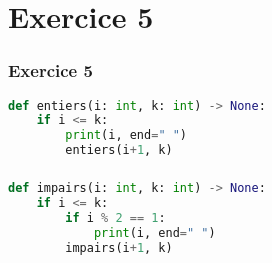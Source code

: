 \documentclass[svgnames,11pt]{beamer}
\begin{document}
\section{Exercice 5}
\begin{frame}[fragile]
    \frametitle{Exercice 5}

\begin{center}
\begin{lstlisting}[language=Python , basicstyle=\ttfamily\small, xleftmargin=2em, xrightmargin=2em]
def entiers(i: int, k: int) -> None:
    if i <= k:
        print(i, end=" ")
        entiers(i+1, k)
\end{lstlisting}
\end{center}  

\end{frame}
\begin{frame}[fragile]
    \frametitle{}

\begin{center}
\begin{lstlisting}[language=Python , basicstyle=\ttfamily\small, xleftmargin=2em, xrightmargin=2em]
def impairs(i: int, k: int) -> None:
    if i <= k:
        if i % 2 == 1:
            print(i, end=" ")
        impairs(i+1, k)
\end{lstlisting}
\end{center}

\end{frame}
\end{document}
